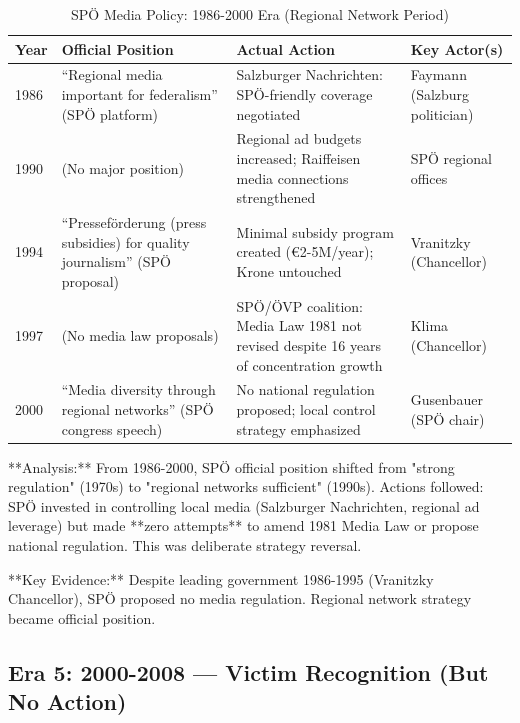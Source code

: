\begin{table}[h]
\centering
\small
\caption{SPÖ Media Policy: 1986-2000 Era (Regional Network Period)}
\label{tab:bh-media-policy-1986-2000}
\begin{tabular}{|p{2.5cm}|p{3cm}|p{3cm}|p{4cm}|}
\hline
\textbf{Year} & \textbf{Official Position} & \textbf{Actual Action} & \textbf{Key Actor(s)} \\
\hline
1986 & ``Regional media important for federalism'' (SPÖ platform) & Salzburger Nachrichten: SPÖ-friendly coverage negotiated & Faymann (Salzburg politician) \\
\hline
1990 & (No major position) & Regional ad budgets increased; Raiffeisen media connections strengthened & SPÖ regional offices \\
\hline
1994 & ``Presseförderung (press subsidies) for quality journalism'' (SPÖ proposal) & Minimal subsidy program created (€2-5M/year); Krone untouched & Vranitzky (Chancellor) \\
\hline
1997 & (No media law proposals) & SPÖ/ÖVP coalition: Media Law 1981 not revised despite 16 years of concentration growth & Klima (Chancellor) \\
\hline
2000 & ``Media diversity through regional networks'' (SPÖ congress speech) & No national regulation proposed; local control strategy emphasized & Gusenbauer (SPÖ chair) \\
\hline
\end{tabular}
\end{table}

**Analysis:** From 1986-2000, SPÖ official position shifted from "strong regulation" (1970s) to "regional networks sufficient" (1990s).
Actions followed: SPÖ invested in controlling local media (Salzburger Nachrichten, regional ad leverage) but made **zero attempts**
to amend 1981 Media Law or propose national regulation. This was deliberate strategy reversal.

**Key Evidence:** Despite leading government 1986-1995 (Vranitzky Chancellor), SPÖ proposed no media regulation. Regional network
strategy became official position.

\subsection*{Era 5: 2000-2008 --- Victim Recognition (But No Action)}


